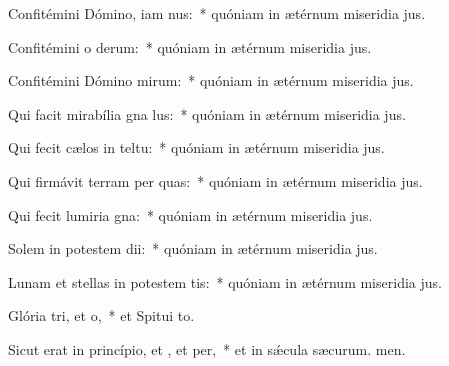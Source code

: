 \item Confitémini Dómino, iam nus:~* quóniam in ætérnum miseridia jus.
\item Confitémini o derum:~* quóniam in ætérnum miseridia jus.
\item Confitémini Dómino mirum:~* quóniam in ætérnum miseridia jus.
\item Qui facit mirabília gna lus:~* quóniam in ætérnum miseridia jus.
\item Qui fecit cælos in teltu:~* quóniam in ætérnum miseridia jus.
\item Qui firmávit terram per quas:~* quóniam in ætérnum miseridia jus.
\item Qui fecit lumiria gna:~* quóniam in ætérnum miseridia jus.
\item Solem in potestem dii:~* quóniam in ætérnum miseridia jus.
\item Lunam et stellas in potestem tis:~* quóniam in ætérnum miseridia jus.
\item Glória tri, et o,~* et Spitui to.
\item Sicut erat in princípio, et , et per,~* et in sǽcula sæcurum. men.
